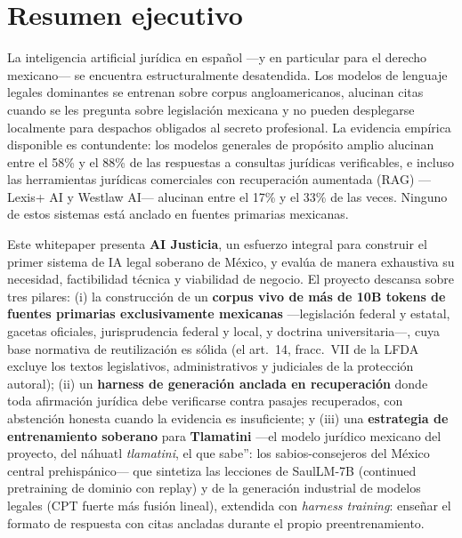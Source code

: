 \section*{Resumen ejecutivo}

La inteligencia artificial jurídica en español ---y en particular para el derecho mexicano--- se encuentra estructuralmente desatendida. Los modelos de lenguaje legales dominantes se entrenan sobre corpus angloamericanos, alucinan citas cuando se les pregunta sobre legislación mexicana y no pueden desplegarse localmente para despachos obligados al secreto profesional. La evidencia empírica disponible es contundente: los modelos generales de propósito amplio alucinan entre el 58\% y el 88\% de las respuestas a consultas jurídicas verificables,\cite{dahl2024} e incluso las herramientas jurídicas comerciales con recuperación aumentada (RAG) ---Lexis+ AI y Westlaw AI--- alucinan entre el 17\% y el 33\% de las veces.\cite{magesh2025} Ninguno de estos sistemas está anclado en fuentes primarias mexicanas.

Este whitepaper presenta \textbf{AI Justicia}, un esfuerzo integral para construir el primer sistema de IA legal soberano de México, y evalúa de manera exhaustiva su necesidad, factibilidad técnica y viabilidad de negocio. El proyecto descansa sobre tres pilares: (i) la construcción de un \textbf{corpus vivo de más de 10B tokens de fuentes primarias exclusivamente mexicanas} ---legislación federal y estatal, gacetas oficiales, jurisprudencia federal y local, y doctrina universitaria---, cuya base normativa de reutilización es sólida (el art.~14, fracc.~VII de la LFDA excluye los textos legislativos, administrativos y judiciales de la protección autoral\cite{lfda}); (ii) un \textbf{harness de generación anclada en recuperación} donde toda afirmación jurídica debe verificarse contra pasajes recuperados, con abstención honesta cuando la evidencia es insuficiente; y (iii) una \textbf{estrategia de entrenamiento soberano} para \textbf{Tlamatini} ---el modelo jurídico mexicano del proyecto, del náhuatl \emph{tlamatini}, el que sabe'': los sabios-consejeros del México central prehispánico--- que sintetiza las lecciones de SaulLM-7B (continued pretraining de dominio con replay)\cite{colombo2024} y de la generación industrial de modelos legales (CPT fuerte más fusión lineal), extendida con \emph{harness training}: enseñar el formato de respuesta con citas ancladas durante el propio preentrenamiento.

